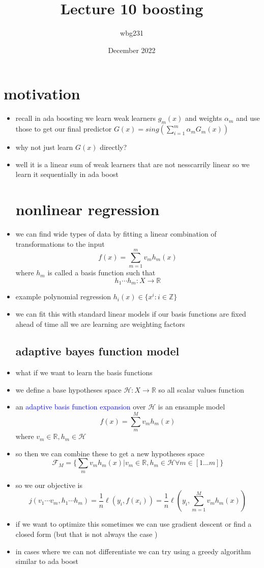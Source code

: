 \documentclass{article}
\title{Lecture 10 boosting }
\author{wbg231 }
\date{December 2022}
\begin{document}
\maketitle

\section{motivation}
\begin{itemize}
\item recall in ada boosting we learn weak learners $g_m(x)$ and weights $\alpha_{m}$ and use those to get our final predictor $G(x)=sing(\sum_{i=1}^{m}\alpha_mG_m(x))$
\item why not just learn $G(x)$ directly? 
\item well it is a linear sum of weak learners that are not nesscarrily linear so we learn it sequentially in ada boost
\section*{nonlinear regression}
\item we can find wide types of data by fitting a linear combination of transformations to the input $$f(x)=\sum_{m=1}^{m}v_{m}h_m(x)$$ where $h_m$ is called a basis function such that $$h_1\cdots h_m:X\rightarrow \mathbb{R}$$
\item example polynomial regression $h_i(x)\in \{x^{i}:i\in \mathbb{Z}\}$ 
\item we can fit this with standard linear models if our basis functions are fixed ahead of time all we are learning are weighting factors  
\subsection*{adaptive bayes function model}
\item what if we want to learn the basis functions
\item we define a base hypotheses space $\mathcal{H}:X\rightarrow \mathbb{R}$ so all scalar values function
\item an \textcolor{blue}{adaptive basis function expansion} over $\mathcal{H}$ is an ensample model $$f(x)=\sum_{m}^{M}v_mh_m(x)$$ where $v_m\in \mathbb{R}, h_{m}\in \mathcal{H}$
\item so then we can combine these to get a new hypotheses space $$\mathcal{F}_{M}=\{\sum_{m}v_mh_m(x)|v_m\in \mathbb{R}, h_m\in \mathcal{H}\forall m\in[1...m]\}$$
\item so we our objective is $$j(v_1\cdots v_m, h_1\cdots h_m)=\frac{1}{n}\ell(y_i,f(x_i))=\frac{1}{n}\ell(y_i,\sum_{m=1}^{M}v_mh_m(x))$$
\item if we want to optimize this sometimes we can use gradient descent or find a closed form (but that is not always the case )
\item in cases where we can not differentiate we can try using a greedy algorithm similar to ada boost

\end{itemize}
\end{document}
